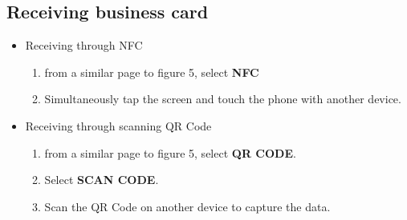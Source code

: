 \documentclass[english]{article}
\begin{document}
\subsection{Receiving business card}
	\begin{itemize}
		\item Receiving through NFC
		\begin{enumerate}
			\item from a similar page to figure 5, select \textbf{NFC}
			\item Simultaneously tap the screen and touch the phone with another device.
		\end{enumerate}
		\item Receiving through scanning QR Code
		\begin{enumerate}
			\item from a similar page to figure 5, select \textbf{QR CODE}.  
			\item Select \textbf{SCAN CODE}.
			\item Scan the QR Code on another device to capture the data.
		\end{enumerate}
	\end{itemize}
\end{document}
